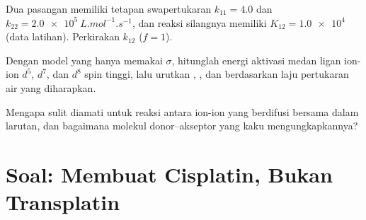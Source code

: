 \begin{exercise}[$\star\star\star$]\label{exo:b3:complex-mechanisms:10}
Dua pasangan memiliki tetapan swapertukaran $k_{11} = 4.0$ dan $k_{22} = \qty{2.0e5}{L.mol^{-1}.s^{-1}}$, dan
reaksi silangnya memiliki $K_{12} = \num{1.0e4}$ (data latihan). Perkirakan $k_{12}$ ($f = 1$).
\end{exercise}

\begin{exercise}[$\star\star\star$]\label{exo:b3:complex-mechanisms:11}
Dengan model yang hanya memakai $\sigma$, hitunglah energi aktivasi medan ligan ion-ion
$d^5$, $d^7$, dan $d^8$ spin tinggi, lalu urutkan , , dan  berdasarkan laju
pertukaran air yang diharapkan.
\end{exercise}

\begin{exercise}[$\star\star\star$]\label{exo:b3:complex-mechanisms:12}
Mengapa  sulit diamati untuk reaksi antara ion-ion yang
berdifusi bersama dalam larutan, dan bagaimana molekul donor--akseptor yang kaku
mengungkapkannya?
\end{exercise}

\section{Soal: Membuat Cisplatin, Bukan Transplatin}

